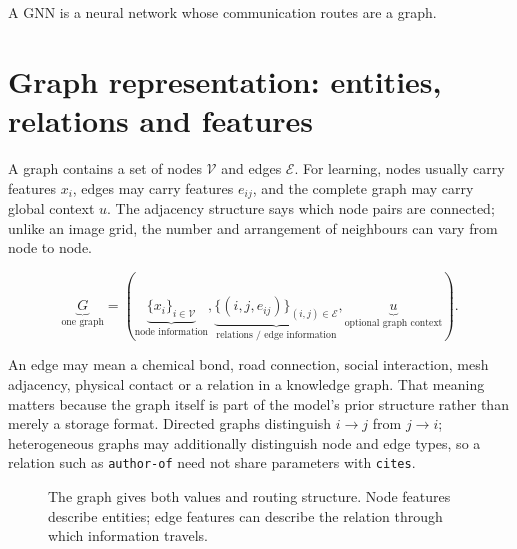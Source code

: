 \begin{calloutintuition}
A GNN is a neural network whose communication routes are a graph.
\end{calloutintuition}

\section{Graph representation: entities, relations and features}
A graph contains a set of nodes $\mathcal V$ and edges $\mathcal E$.
For learning, nodes usually carry features $x_i$, edges may carry features $e_{ij}$, and the complete graph may carry global context $u$.
The adjacency structure says which node pairs are connected; unlike an image grid, the number and arrangement of neighbours can vary from node to node.

\[
\underbrace{G}_{\text{one graph}}
=
\left(
\underbrace{\{x_i\}_{i\in\mathcal V}}_{\text{node information}},
\underbrace{\{(i,j,e_{ij})\}_{(i,j)\in\mathcal E}}_{\text{relations / edge information}},
\underbrace{u}_{\text{optional graph context}}
\right).
\]

An edge may mean a chemical bond, road connection, social interaction, mesh adjacency, physical contact or a relation in a knowledge graph.
That meaning matters because the graph itself is part of the model's prior structure rather than merely a storage format.
Directed graphs distinguish $i\rightarrow j$ from $j\rightarrow i$; heterogeneous graphs may additionally distinguish node and edge types, so a relation such as \texttt{author-of} need not share parameters with \texttt{cites}.

\begin{figure}[htbp]
\centering
{}
\caption{The graph gives both values and routing structure. Node features describe entities; edge features can describe the relation through which information travels.}
\label{fig:gnn-graph-representation}
\end{figure}

